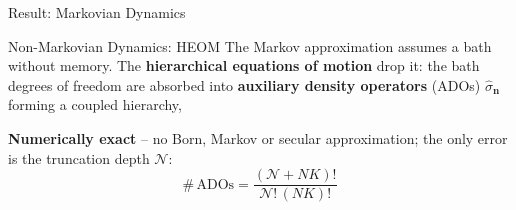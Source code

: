 \begin{frame}[t]{}
\begin{postercolumn}
  \begin{block}{Result: Markovian Dynamics}
  \end{block}%
\end{postercolumn}\hspace{\colsep}%
\begin{postercolumn}

  \begin{block}{Non-Markovian Dynamics: HEOM}
    The Markov approximation assumes a bath without memory. The
    \textbf{hierarchical equations of motion} drop it: the bath degrees of
    freedom are absorbed into \textbf{auxiliary density operators} (ADOs)
    $\hat\sigma_{\mathbf n}$ forming a coupled hierarchy,

    \textbf{Numerically exact} -- no Born, Markov or secular approximation;
    the only error is the truncation depth $\mathcal{N}$:
    \[ \#\,\mathrm{ADOs} = \frac{(\mathcal{N}+NK)!}{\mathcal{N}!\,(NK)!} \]
  \end{block}


\end{postercolumn}
\end{frame}
